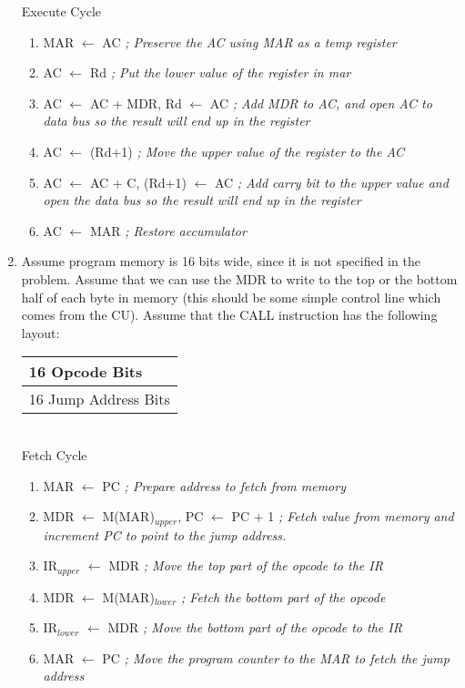 \documentclass[12pt,letterpaper]{article}
\begin{document}
\begin{enumerate}
    Execute Cycle
    \begin{enumerate}[i]
        \item MAR $\leftarrow$ AC \emph{; Preserve the AC using MAR as a temp register}
        \item AC $\leftarrow$ Rd \emph{; Put the lower value of the register in mar}
        \item AC $\leftarrow$ AC + MDR, Rd $\leftarrow$ AC \emph{; Add MDR to AC, and open AC to data bus so the result will end up in the register}
        \item AC  $\leftarrow$ (Rd+1) \emph{; Move the upper value of the register to the AC}
        \item AC $\leftarrow$ AC + C, (Rd+1) $\leftarrow$ AC \emph{; Add carry bit to the upper value and open the data bus so the result will end up in the register}
        \item AC $\leftarrow$ MAR \emph{; Restore accumulator}
    \end{enumerate}
    \item Assume program memory is 16 bits wide, since it is not specified in the problem. Assume that we can use the MDR to write to the top or the bottom half of each byte in memory (this should be some simple control line which comes from the CU). Assume that the CALL instruction has the following layout:\\
    \begin{tabular}{l}
        16 Opcode Bits\\
        \hline
        16 Jump Address Bits
    \end{tabular}\\
    Fetch Cycle
    \begin{enumerate}[i]
        \item MAR $\leftarrow$ PC \emph{; Prepare address to fetch from memory}
        \item MDR $\leftarrow$ M(MAR)$_{upper}$, PC $\leftarrow$ PC + 1 \emph{; Fetch value from memory and increment PC to point to the jump address.}
        \item IR$_{upper}$ $\leftarrow$ MDR \emph{; Move the top part of the opcode to the IR}
        \item MDR $\leftarrow$ M(MAR)$_{lower}$ \emph{; Fetch the bottom part of the opcode}
        \item IR$_{lower}$ $\leftarrow$ MDR \emph{; Move the bottom part of the opcode to the IR}
        \item MAR $\leftarrow$ PC \emph{; Move the program counter to the MAR to fetch the jump address}

\end{enumerate}
\end{enumerate}
\end{document}
